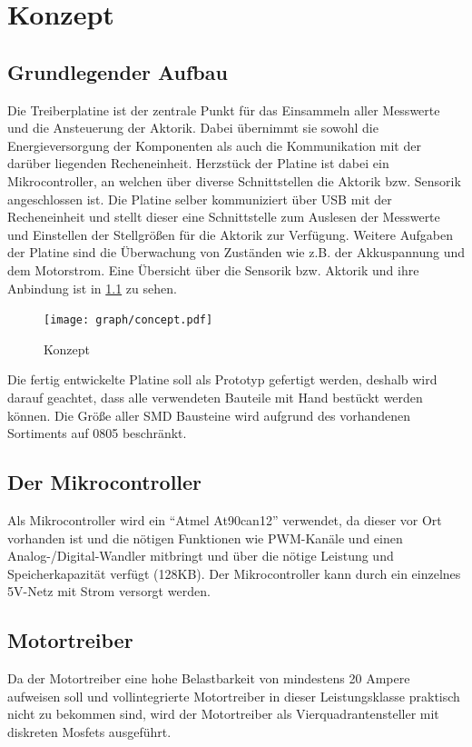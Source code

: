 
\chapter{Konzept}

\section{Grundlegender Aufbau}

Die Treiberplatine ist der zentrale Punkt für das Einsammeln aller Messwerte und die Ansteuerung der Aktorik. Dabei übernimmt sie sowohl die Energieversorgung der Komponenten als auch
die Kommunikation mit der darüber liegenden Recheneinheit. Herzstück der Platine ist dabei ein Mikrocontroller, an welchen über diverse Schnittstellen die Aktorik bzw. Sensorik
angeschlossen ist. Die Platine selber kommuniziert über USB mit der Recheneinheit und stellt dieser eine Schnittstelle zum Auslesen der Messwerte und Einstellen der Stellgrößen für die Aktorik
zur Verfügung. Weitere Aufgaben der Platine sind die Überwachung von Zuständen wie z.B. der Akkuspannung und dem Motorstrom. Eine Übersicht über die Sensorik bzw. Aktorik und ihre Anbindung ist in 
\cref{fig:konzept} zu sehen.

\begin{figure}[H]
\centering
\texttt{[image: graph/concept.pdf]}\\
\caption{Konzept}
\label{fig:konzept}
\end{figure}


Die fertig entwickelte Platine soll als Prototyp gefertigt werden, deshalb wird darauf geachtet, dass alle verwendeten Bauteile mit Hand bestückt werden können.
Die Größe aller SMD Bausteine wird aufgrund des vorhandenen Sortiments auf 0805 beschränkt.


\section{Der Mikrocontroller}
Als Mikrocontroller wird ein ``Atmel At90can12''\cite{ds-at90can} verwendet, da dieser vor Ort vorhanden ist und die nötigen Funktionen wie PWM-Kanäle und einen Analog-/Digital-Wandler mitbringt und 
über die nötige Leistung und Speicherkapazität verfügt (128KB). Der Mikrocontroller kann durch ein einzelnes 5V-Netz mit Strom versorgt werden.




\section{Motortreiber}
Da der Motortreiber eine hohe Belastbarkeit von mindestens 20 Ampere aufweisen soll und
vollintegrierte Motortreiber in dieser Leistungsklasse praktisch nicht zu bekommen sind, wird der Motortreiber als Vierquadrantensteller mit diskreten Mosfets ausgeführt.

